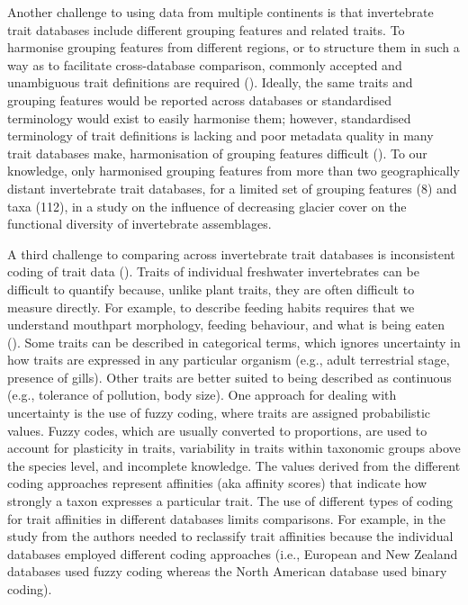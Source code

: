 \documentclass[12pt]{article}
\begin{document}
Another challenge to using data from multiple continents is that invertebrate trait databases include different grouping features and related traits. To harmonise grouping features from different regions, or to structure them in such a way as to facilitate cross-database comparison, commonly accepted and unambiguous trait definitions are required (\cite{schneider_towards_2019}). Ideally, the same traits and grouping features would be reported across databases or standardised terminology would exist to easily harmonise them; however, standardised terminology of trait definitions is lacking and poor metadata quality in many trait databases make, harmonisation of grouping features difficult (\cite{baird_toward_2011, kissling_towards_2018}). To our knowledge, only \citet{brown_functional_2018} harmonised grouping features from more than two geographically distant invertebrate trait databases, for a limited set of grouping features (8) and taxa (112), in a study on the influence of decreasing glacier cover on the functional diversity of invertebrate assemblages.

A third challenge to comparing across invertebrate trait databases is inconsistent coding of trait data (\cite{culp_incorporating_2011}). Traits of individual freshwater invertebrates can be difficult to quantify because, unlike plant traits, they are often difficult to measure directly. For example, to describe feeding habits requires that we understand mouthpart morphology, feeding behaviour, and what is being eaten (\cite{moog_comprehensive_nodate}). Some traits can be described in categorical terms, which ignores uncertainty in how traits are expressed in any particular organism (e.g., adult terrestrial stage, presence of gills). Other traits are better suited to being described as continuous (e.g., tolerance of pollution, body size). One approach for dealing with uncertainty is the use of fuzzy coding, where traits are assigned probabilistic values. Fuzzy codes, which are usually converted to proportions, are used to account for plasticity in traits, variability in traits within taxonomic groups above the species level, and incomplete knowledge. The values derived from the different coding approaches represent affinities (aka affinity scores) that indicate how strongly a taxon expresses a particular trait. The use of different types of coding for trait affinities in different databases limits comparisons. For example, in the study from \citet{brown_functional_2018} the authors needed to reclassify trait affinities because the individual databases employed different coding approaches (i.e., European and New Zealand databases used fuzzy coding whereas the North American database used binary coding). 
\end{document}
